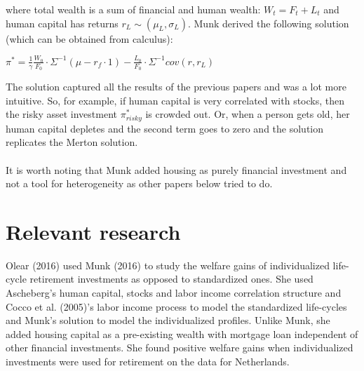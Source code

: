 where total wealth is a sum of financial and human wealth: $W_t = F_t + L_t$ and human capital has returns $r_L \sim (\mu_L, \sigma_L)$. Munk derived the following solution (which can be obtained from calculus):

\begin{center}
	$\pi^* = \frac{1}{\gamma} \frac{W_0}{F_0} \cdot \Sigma^{-1} (\mu - r_f \cdot 1) - \frac{L_0}{F_0} \cdot \Sigma^{-1} cov(r,r_L)$
\end{center}

The solution captured all the results of the previous papers and was a lot more intuitive. So, for example, if human capital is very correlated with stocks, then the risky asset investment $\pi^*_{risky}$ is crowded out. Or, when a person gets old, her human capital depletes and the second term goes to zero and the solution replicates the Merton solution.

\paragraph{}It is worth noting that Munk added housing as purely financial investment and not a tool for heterogeneity as other papers below tried to do. 

\section{Relevant research}
Olear (2016) used Munk (2016) to study the welfare gains of individualized life-cycle retirement investments as opposed to standardized ones. She used Ascheberg's human capital, stocks and labor income correlation structure and Cocco et al. (2005)'s labor income process to model the standardized life-cycles and Munk's solution to model the individualized profiles. Unlike Munk, she added housing capital as a pre-existing wealth with mortgage loan independent of other financial investments. She found positive welfare gains when individualized investments were used for retirement on the data for Netherlands.
